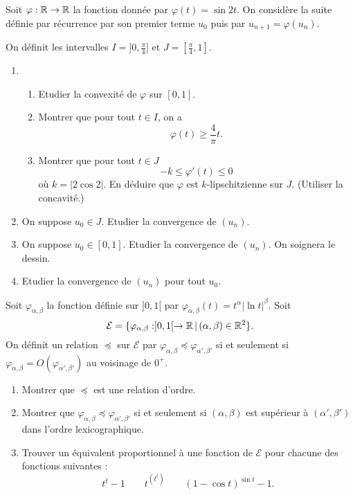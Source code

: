 Soit $\varphi:\mathbb{R} \rightarrow \mathbb{R}$ la fonction donnée par $\varphi
(t) = \sin 2t$. On considère la suite définie par récurrence par
son premier terme $u_0$ puis par $u_{n+1}=\varphi(u_n)$.
\par
On définit les intervalles $I=]0,\frac{\pi}{4}]$ et
$J=[\frac{\pi}{4},1]$.
\begin{enumerate}
    \item \begin{enumerate}
        \item Etudier la convexité de $\varphi$ sur $[0,1]$.
        \item Montrer que pour tout $t\in I$, on a
        $$\varphi(t)\geq \frac{4}{\pi}t.$$
        \item Montrer que pour tout $t\in J$
        $$-k\leq \varphi'(t) \leq 0$$
        où $k=|2\cos2|$. En déduire que $\varphi$ est
        $k$-lipschitzienne sur $J$. (Utiliser la concavité.)
    \end{enumerate}
    \item On suppose $u_0 \in J$. Etudier la convergence de
    $(u_n)$.
    \item On suppose $u_0 \in [0,1]$. Etudier la convergence de
    $(u_n)$. On soignera le dessin.
    \item Etudier la convergence de $(u_n)$ pour tout $u_0$.
\end{enumerate}




Soit $\varphi_{\alpha,\beta}$ la fonction définie sur $]0,1[$ par
$\varphi_{\alpha,\beta}(t) = t^{\alpha}|\ln t|^{\beta}$. Soit
$$\mathcal{E}=\{\varphi_{\alpha,\beta}: ]0,1[ \rightarrow \mathbb{R} \,| \,
(\alpha,\beta) \in \mathbb{R}^2 \}.$$
On définit un relation $\preceq$ sur
$\mathcal{E}$ par $\varphi_{\alpha,\beta} \preceq
\varphi_{\alpha',\beta'}$ si et seulement si
$\varphi_{\alpha,\beta} = O(\varphi_{\alpha',\beta'})$ au
voisinage de $0^+$.
\begin{enumerate}
    \item Montrer que $\preceq$ est une relation d'ordre.
    \item Montrer que $\varphi_{\alpha,\beta} \preceq
\varphi_{\alpha',\beta'}$ si et seulement si $(\alpha,\beta)$ est
supérieur à $(\alpha',\beta')$ dans l'ordre lexicographique.
    \item Trouver un équivalent proportionnel à une fonction de
    $\mathcal{E}$ pour chacune des fonctions suivantes :
    $$t^t-1 \qquad t^{(t^t)} \qquad (1-\cos t)^{\sin t}-1.$$
\end{enumerate}

